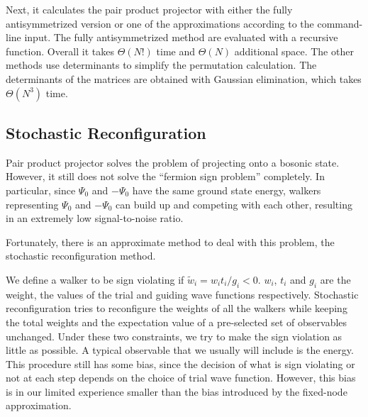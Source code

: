 \documentclass[%
reprint,
nofootinbib,
amsmath,amssymb,
aps,
prl,
]{revtex4-1}
\begin{document}
Next, it calculates the pair product projector with either the fully antisymmetrized version or one of the approximations according to the command-line input.
The fully antisymmetrized method are evaluated with a recursive function.
Overall it takes $\Theta(N!)$ time and $\Theta(N)$ additional space.
The other methods use determinants to simplify the permutation calculation.
The determinants of the matrices are obtained with Gaussian elimination, which takes $\Theta(N^3)$ time.

\subsection{Stochastic Reconfiguration}

Pair product projector solves the problem of projecting onto a bosonic state.
However, it still does not solve the ``fermion sign problem'' completely.
In particular, since $\Psi_0$ and $-\Psi_0$ have the same ground state energy, walkers representing $\Psi_0$ and $-\Psi_0$ can build up and competing with each other, resulting in an extremely low signal-to-noise ratio.

Fortunately, there is an approximate method to deal with this problem, the stochastic reconfiguration method.

We define a walker to be sign violating if $\widetilde{w}_i = w_it_i/g_i < 0$.
$w_i$, $t_i$ and $g_i$ are the weight, the values of the trial and guiding wave functions respectively.
Stochastic reconfiguration tries to reconfigure the weights of all the walkers while keeping the total weights and the expectation value of a pre-selected set of observables unchanged.
Under these two constraints, we try to make the sign violation as little as possible.
A typical observable that we usually will include is the energy.
This procedure still has some bias, since the decision of what is sign violating or not at each step depends on the choice of trial wave function.
However, this bias is in our limited experience smaller than the bias introduced by the fixed-node approximation.


%
\end{document}
